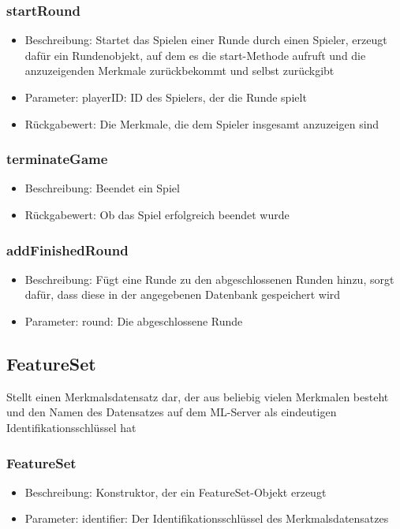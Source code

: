 \documentclass[a4paper]{scrreprt}
\begin{document}
	\subsubsection{startRound}
		\begin{itemize}
			\item Beschreibung: Startet das Spielen einer Runde durch einen Spieler, erzeugt dafür ein Rundenobjekt, auf dem es die start-Methode aufruft und die anzuzeigenden Merkmale zurückbekommt und selbst zurückgibt
			\item Parameter: playerID: ID des Spielers, der die Runde spielt
			\item Rückgabewert: Die Merkmale, die dem Spieler insgesamt anzuzeigen sind
		\end{itemize}
	\subsubsection{terminateGame}
		\begin{itemize}
			\item Beschreibung: Beendet ein Spiel
			\item Rückgabewert: Ob das Spiel erfolgreich beendet wurde
		\end{itemize}
	\subsubsection{addFinishedRound}
	\begin{itemize}
	\item Beschreibung: Fügt eine Runde zu den abgeschlossenen Runden hinzu, sorgt dafür, dass diese in der angegebenen Datenbank gespeichert wird
	\item Parameter: round: Die abgeschlossene Runde
	\end{itemize}

	\subsection{FeatureSet}
	Stellt einen Merkmalsdatensatz dar, der aus beliebig vielen Merkmalen besteht und den Namen des Datensatzes auf dem ML-Server als eindeutigen Identifikationsschlüssel hat
	\subsubsection{FeatureSet}
		\begin{itemize}
		\item Beschreibung: Konstruktor, der ein FeatureSet-Objekt erzeugt
		\item Parameter: identifier: Der Identifikationsschlüssel des Merkmalsdatensatzes
		\end{itemize}
\end{document}
